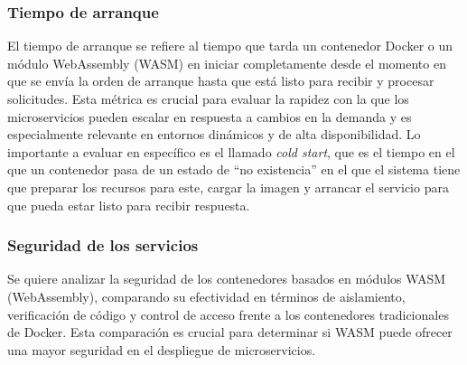 \subsubsection{Tiempo de arranque}

El tiempo de arranque se refiere al tiempo que tarda un contenedor Docker o un módulo WebAssembly (WASM) en iniciar completamente desde el momento en que se envía la orden de arranque hasta que está listo para recibir y procesar solicitudes. Esta métrica es crucial para evaluar la rapidez con la que los microservicios pueden escalar en respuesta a cambios en la demanda y es especialmente relevante en entornos dinámicos y de alta disponibilidad. Lo importante a evaluar en específico es el llamado \textit{cold start}, que es el tiempo en el que un contenedor pasa de un estado de “no existencia” en el que el sistema tiene que preparar los recursos para este, cargar la imagen y arrancar el servicio para que pueda estar listo para recibir respuesta.

\subsubsection{Seguridad de los servicios}

Se quiere analizar la seguridad de los contenedores basados en módulos WASM (WebAssembly), comparando su efectividad en términos de aislamiento, verificación de código y control de acceso frente a los contenedores tradicionales de Docker. Esta comparación es crucial para determinar si WASM puede ofrecer una mayor seguridad en el despliegue de microservicios.